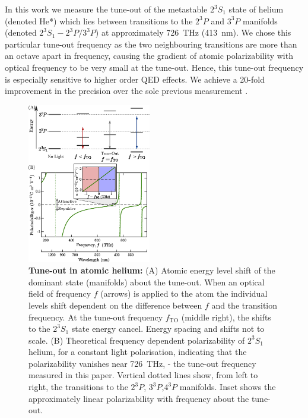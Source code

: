 \documentclass[aps,prl,
reprint,
superscriptaddress,
 amsmath,amssymb,
floatfix
]{revtex4-2}
\newcommand{\MetastableState}{2^{3\!}S_1}%
\newcommand{\UpperStateManifold}{3^{3\!}P}%
\newcommand{\LowerStateManifold}{2^{3\!}P}%
\newcommand{\TO}{\MetastableState- \LowerStateManifold / \UpperStateManifold}%
\begin{document}
In this work we measure the tune-out of the metastable $\MetastableState$ state of helium (denoted He*) which lies between transitions to the $\LowerStateManifold$ and $\UpperStateManifold$ manifolds (denoted $\TO$) at approximately 726~THz (413~nm). We chose this particular tune-out frequency as the two neighbouring transitions are more than an octave apart in frequency, causing the gradient of atomic polarizability with optical frequency to be very small at the tune-out. Hence, this tune-out frequency is especially sensitive to higher order QED effects. We achieve a 20-fold improvement in the precision over the sole previous measurement \cite{PhysRevLett.115.043004}.
\begin{figure} 
\centering
\includegraphics[width=0.48\textwidth]{figs/composite_polz_fig}
\caption{\textbf{Tune-out in atomic helium:}
(A) Atomic energy level shift of the dominant state (manifolds) about the tune-out.  When an optical field of frequency $f$ (arrows) is applied to the atom the individual
levels shift dependent on the difference between $f$ and the transition frequency. At the tune-out frequency $f_{\mathrm{TO}}$ (middle right), the shifts to the $\MetastableState$ state energy cancel.
Energy spacing and shifts not to scale.
(B) Theoretical frequency dependent polarizability of $\MetastableState$ helium, for a constant light polarisation, indicating that the polarizability vanishes near 726~THz, - the tune-out frequency measured in this paper. 
Vertical dotted lines show, from left to right, the transitions to the  $\LowerStateManifold$, $\UpperStateManifold$,$4^{3\!}P$ manifolds. Inset shows the approximately linear polarizability with frequency about the tune-out.
}
\label{fig:schematic} 
\end{figure}
\end{document}
